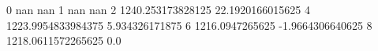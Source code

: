 0 nan nan
1 nan nan
2 1240.253173828125 22.1920166015625
4 1223.9954833984375 5.934326171875
6 1216.0947265625 -1.9664306640625
8 1218.0611572265625 0.0
